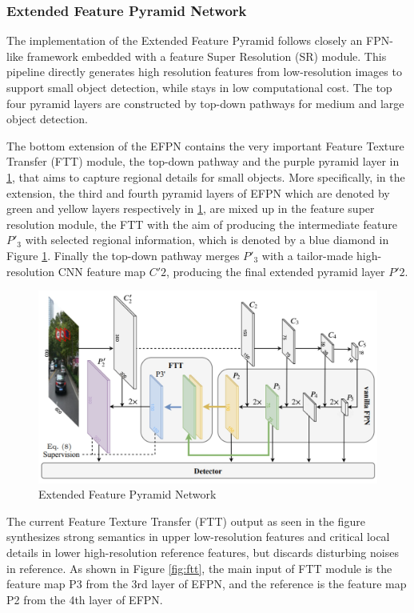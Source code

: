 \subsubsection{Extended Feature Pyramid Network}  \label{efpn-section}

The implementation of the Extended Feature Pyramid follows closely an FPN-like framework embedded with a feature Super Resolution (SR) \cite{sr} module. 
This pipeline directly generates high resolution features from low-resolution images to support small object detection, while stays in low computational 
cost. The top four pyramid layers are constructed by top-down pathways for medium and large object detection. 

The bottom extension of the EFPN  contains the very important Feature Texture Transfer (FTT) module, the top-down pathway and the purple pyramid layer in 
\ref{fig:efpn}, that aims to capture regional details for small objects. More specifically, in the extension, the third and fourth pyramid layers of EFPN which 
are denoted by green and yellow layers respectively in \ref{fig:efpn}, are mixed up in the feature super resolution module, the FTT with the aim of producing the 
intermediate feature $P'_{3}$ with selected regional information, which is denoted by a blue diamond in Figure \ref{fig:efpn}. Finally the top-down pathway merges 
$P'_{3}$ with a tailor-made high-resolution CNN feature map $C'2$, producing the final extended pyramid layer $P'2$.


\begin{figure}[h!]
    \centering
    \includegraphics[scale=0.15]{Figures/efpn.jpg}
    \caption{Extended Feature Pyramid Network \cite{efpn}}
    \label{fig:efpn}
\end{figure}

The current Feature Texture Transfer (FTT) output as seen in the figure  synthesizes strong semantics in upper low-resolution features and critical local details in lower high-resolution 
reference features, but discards disturbing noises in reference. As shown in Figure \ref{fig:ftt}, the main input of FTT module is the feature map P3
from the 3rd layer of EFPN, and the reference is the feature map P2 from the 4th layer of EFPN. 

